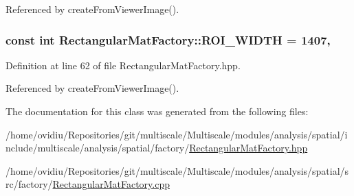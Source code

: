Referenced by create\-From\-Viewer\-Image().

\hypertarget{classmultiscale_1_1analysis_1_1RectangularMatFactory_aeb6f19ae65802df5f876cd0e15b27a48}{
\subsubsection[{R\-O\-I\-\_\-\-W\-I\-D\-T\-H}]{\setlength{\rightskip}{0pt plus 5cm}const int Rectangular\-Mat\-Factory\-::\-R\-O\-I\-\_\-\-W\-I\-D\-T\-H = 1407\hspace{0.3cm}{\ttfamily [static]}, {\ttfamily [private]}}}\label{classmultiscale_1_1analysis_1_1RectangularMatFactory_aeb6f19ae65802df5f876cd0e15b27a48}


Definition at line 62 of file Rectangular\-Mat\-Factory.\-hpp.



Referenced by create\-From\-Viewer\-Image().



The documentation for this class was generated from the following files\-:\begin{DoxyCompactItemize}
\item 
/home/ovidiu/\-Repositories/git/multiscale/\-Multiscale/modules/analysis/spatial/include/multiscale/analysis/spatial/factory/\hyperlink{RectangularMatFactory_8hpp}{Rectangular\-Mat\-Factory.\-hpp}\item 
/home/ovidiu/\-Repositories/git/multiscale/\-Multiscale/modules/analysis/spatial/src/factory/\hyperlink{RectangularMatFactory_8cpp}{Rectangular\-Mat\-Factory.\-cpp}\end{DoxyCompactItemize}
